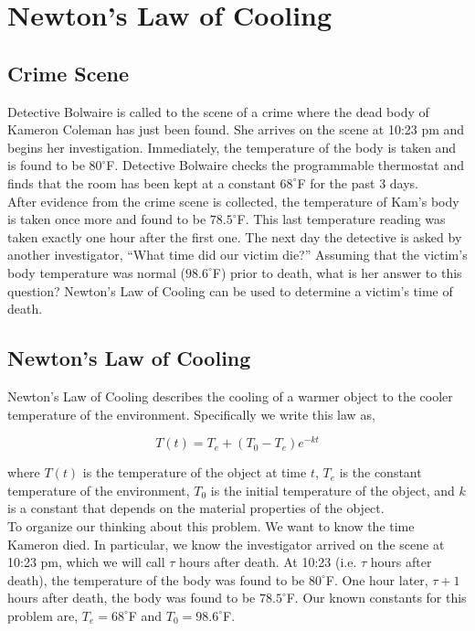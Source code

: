 \documentclass[12pt]{article}
\begin{document}
\section{Newton's Law of Cooling}

\subsection*{Crime Scene}

Detective Bolwaire is called to the scene of a crime where the dead body of Kameron Coleman has just been found. She arrives on the scene at 10:23 pm and begins her investigation. Immediately, the temperature of the body is taken and is found to be $80^{\circ}$F. Detective Bolwaire checks the programmable thermostat and finds that the room has been kept at a constant $68^{\circ}$F for the past 3 days.\\

After evidence from the crime scene is collected, the temperature of  Kam's body is taken once more and found to be $78.5^{\circ}$F. This last temperature reading was taken exactly one hour after the first one. The next day the detective is asked by another investigator, “What time did our victim die?” Assuming that the victim’s body temperature was normal ($98.6^{\circ}$F) prior to death, what is her answer to this question? Newton's Law of Cooling can be used to determine a victim's time of death.\\

\subsection*{Newton's Law of Cooling}

Newton’s Law of Cooling describes the cooling of a warmer object to the cooler temperature of the environment. Specifically we write this law as,

$$T(t) = T_e + (T_0 - T_e ) e^{-kt}$$

where $T(t)$ is the temperature of the object at time $t$, $T_e$ is the constant temperature of the environment, $T_0$ is the initial temperature of the object, and $k$ is a constant that depends on the material properties of the object.\\

To organize our thinking about this problem. We want to know the time Kameron died. In particular, we know the investigator arrived on the scene at 10:23 pm, which we will call $\tau$ hours after death. At 10:23 (i.e. $\tau$ hours after death), the temperature of the body was found to be $80^{\circ}$F. One hour later, $\tau + 1$ hours after death, the body was found to be $78.5^{\circ}$F. Our known constants for this problem are, $T_e = 68^{\circ}$F and $T_0 = 98.6^{\circ}$F.\\
\end{document}
